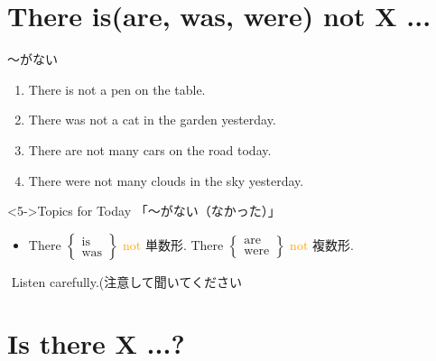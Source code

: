 \documentclass[aspectratio=169]{beamer}
\newcommand{\myaudio}[1]{\href{#1}{\faVolumeUp}}
\begin{document}
\section{There is(are, was, were) not X ...}
\begin{frame}[plain]{〜がない}

\begin{enumerate}[<+->]
 \item There is not a pen on the table.
 \item There was not a cat in the garden yesterday.
 \item There are not many cars on the road today.
 \item There were not many clouds in the sky yesterday.
\end{enumerate}

\pause 
\begin{exampleblock}<5->{Topics for Today}
「〜がない（なかった）」
\begin{itemize}
 \item There $\left\{\begin{array}{l}\text{is}\\\text{was}\end{array}
\right\}$ \textcolor{orange}{not} 単数形.\hspace{40pt}\pause
There $\left\{\begin{array}{l}\text{are}\\\text{were}\end{array}
\right\}$ \textcolor{orange}{not} 複数形.
\end{itemize}
\end{exampleblock}

\pause
\myaudio{audio/001_there_is_03.mp3}\,\,{}Listen carefully.(注意して聞いてください\end{frame}

\section{Is there X ...?}
\end{document}
